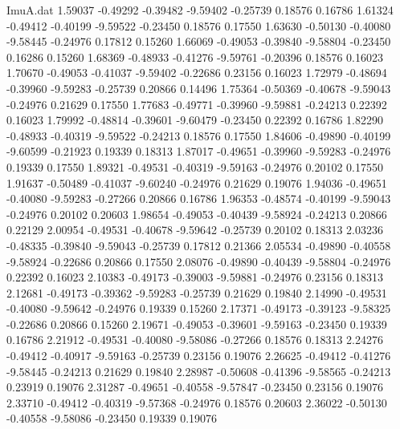 \begin{filecontents}{ImuA.dat}
   1.59037   -0.49292   -0.39482   -9.59402   -0.25739    0.18576    0.16786
   1.61324   -0.49412   -0.40199   -9.59522   -0.23450    0.18576    0.17550
   1.63630   -0.50130   -0.40080   -9.58445   -0.24976    0.17812    0.15260
   1.66069   -0.49053   -0.39840   -9.58804   -0.23450    0.16286    0.15260
   1.68369   -0.48933   -0.41276   -9.59761   -0.20396    0.18576    0.16023
   1.70670   -0.49053   -0.41037   -9.59402   -0.22686    0.23156    0.16023
   1.72979   -0.48694   -0.39960   -9.59283   -0.25739    0.20866    0.14496
   1.75364   -0.50369   -0.40678   -9.59043   -0.24976    0.21629    0.17550
   1.77683   -0.49771   -0.39960   -9.59881   -0.24213    0.22392    0.16023
   1.79992   -0.48814   -0.39601   -9.60479   -0.23450    0.22392    0.16786
   1.82290   -0.48933   -0.40319   -9.59522   -0.24213    0.18576    0.17550
   1.84606   -0.49890   -0.40199   -9.60599   -0.21923    0.19339    0.18313
   1.87017   -0.49651   -0.39960   -9.59283   -0.24976    0.19339    0.17550
   1.89321   -0.49531   -0.40319   -9.59163   -0.24976    0.20102    0.17550
   1.91637   -0.50489   -0.41037   -9.60240   -0.24976    0.21629    0.19076
   1.94036   -0.49651   -0.40080   -9.59283   -0.27266    0.20866    0.16786
   1.96353   -0.48574   -0.40199   -9.59043   -0.24976    0.20102    0.20603
   1.98654   -0.49053   -0.40439   -9.58924   -0.24213    0.20866    0.22129
   2.00954   -0.49531   -0.40678   -9.59642   -0.25739    0.20102    0.18313
   2.03236   -0.48335   -0.39840   -9.59043   -0.25739    0.17812    0.21366
   2.05534   -0.49890   -0.40558   -9.58924   -0.22686    0.20866    0.17550
   2.08076   -0.49890   -0.40439   -9.58804   -0.24976    0.22392    0.16023
   2.10383   -0.49173   -0.39003   -9.59881   -0.24976    0.23156    0.18313
   2.12681   -0.49173   -0.39362   -9.59283   -0.25739    0.21629    0.19840
   2.14990   -0.49531   -0.40080   -9.59642   -0.24976    0.19339    0.15260
   2.17371   -0.49173   -0.39123   -9.58325   -0.22686    0.20866    0.15260
   2.19671   -0.49053   -0.39601   -9.59163   -0.23450    0.19339    0.16786
   2.21912   -0.49531   -0.40080   -9.58086   -0.27266    0.18576    0.18313
   2.24276   -0.49412   -0.40917   -9.59163   -0.25739    0.23156    0.19076
   2.26625   -0.49412   -0.41276   -9.58445   -0.24213    0.21629    0.19840
   2.28987   -0.50608   -0.41396   -9.58565   -0.24213    0.23919    0.19076
   2.31287   -0.49651   -0.40558   -9.57847   -0.23450    0.23156    0.19076
   2.33710   -0.49412   -0.40319   -9.57368   -0.24976    0.18576    0.20603
   2.36022   -0.50130   -0.40558   -9.58086   -0.23450    0.19339    0.19076

\end{filecontents}
